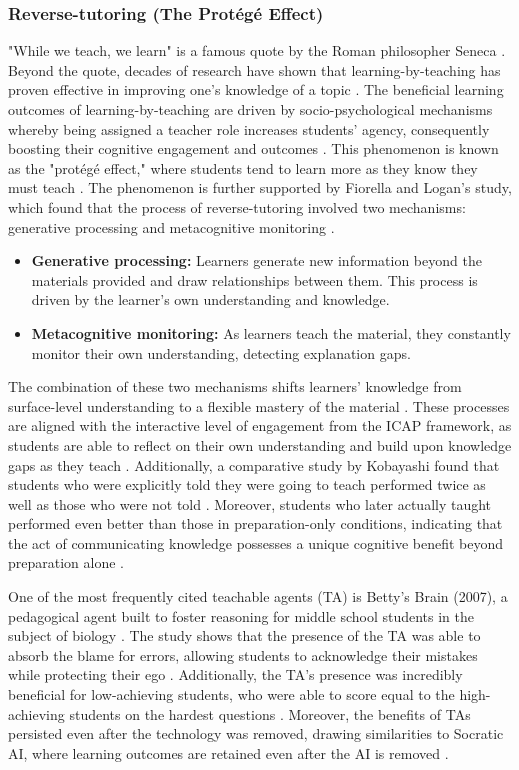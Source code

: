 \documentclass{article}
\begin{document}
\subsubsection{Reverse-tutoring (The Protégé Effect)}
"While we teach, we learn" is a famous quote by the Roman philosopher Seneca \cite{Wong2026}. 
Beyond the quote, decades of research have shown that learning-by-teaching 
has proven effective in improving one’s knowledge of a topic \cite{Wong2026,Kobayashi2024}. 
The beneficial learning outcomes of learning-by-teaching 
are driven by socio-psychological mechanisms 
whereby being assigned a teacher role increases students' agency, 
consequently boosting their cognitive engagement and outcomes \cite{Wong2026,Okita2013}. 
This phenomenon is known as the "protégé effect," where students tend to learn more 
as they know they must teach \cite{Okita2013}. 
The phenomenon is further supported by Fiorella and Logan's study, 
which found that the process of reverse-tutoring 
involved two mechanisms: generative processing and metacognitive monitoring \cite{Fiorella2023}. 
\begin{itemize}
    \item \textbf{Generative processing:} Learners generate new information beyond the materials provided and draw relationships between them. This process is driven by the learner's own understanding and knowledge.
    \item \textbf{Metacognitive monitoring:} As learners teach the material, they constantly monitor their own understanding, detecting explanation gaps.
\end{itemize}
The combination of these two mechanisms shifts learners' knowledge 
from surface-level understanding to a flexible mastery of the material \cite{Fiorella2023}. 
These processes are aligned with the interactive level of engagement from the ICAP framework, as 
students are able to reflect on their own understanding and build upon knowledge gaps 
as they teach \cite{Chi2014,Fiorella2023}. Additionally, a comparative study by 
Kobayashi found that students who were explicitly 
told they were going to teach performed twice as well as those who were not told \cite{Kobayashi2024}. 
Moreover, students who later actually taught 
performed even better than those in preparation-only conditions, 
indicating that the act of communicating knowledge 
possesses a unique cognitive benefit beyond preparation alone \cite{Kobayashi2024}.

One of the most frequently cited teachable agents (TA) is Betty's Brain (2007), a pedagogical agent 
built to foster reasoning for middle school students in the subject of biology \cite{BettyBrain2007}. 
The study shows that the presence of the TA was able to absorb the blame for errors, 
allowing students to acknowledge their mistakes while protecting their ego \cite{BettyBrain2007}. 
Additionally, the TA's presence was incredibly beneficial for low-achieving students, who 
were able to score equal to the high-achieving students on the hardest questions \cite{Silvervarg2021,BettyBrain2007}. 
Moreover, the benefits of TAs persisted even after the technology was removed, drawing similarities 
to Socratic AI, where learning outcomes are retained even after the AI is removed \cite{Chin2010,Bastani2025}.
\end{document}
